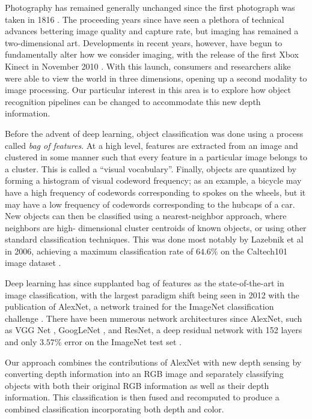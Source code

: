 
Photography has remained generally unchanged since the first photograph was
taken in 1816 \cite{Beaumont1982_photography}. The proceeding years since have
seen a plethora of technical advances bettering image quality and capture rate,
but imaging has remained a two-dimensional art. Developments in recent years,
however, have begun to fundamentally alter how we consider imaging, with the
release of the first Xbox Kinect in November 2010 \cite{Alex2009_kinect}. With
this launch, consumers and researchers alike were able to view the world in
three dimensions, opening up a second modality to image processing. Our
particular interest in this area is to explore how object recognition pipelines
can be changed to accommodate this new depth information.

Before the advent of deep learning, object classification was done using a
process called \textit{bag of features}. At a high level, features are extracted
from an image and clustered in some manner such that every feature in a
particular image belongs to a cluster. This is called a ``visual vocabulary''.
Finally, objects are quantized by forming a histogram of visual codeword
frequency; as an example, a bicycle may have a high frequency of codewords
corresponding to spokes on the wheels, but it may have a low frequency of
codewords corresponding to the hubcaps of a car. New objects can then be
classified using a nearest-neighbor approach, where neighbors are high-
dimensional cluster centroids of known objects, or using other standard
classification techniques. This was done most notably by Lazebnik et al in 2006,
achieving a maximum classification rate of $64.6\%$ on the Caltech101 image
dataset \cite{lazebnik_bof}.

Deep learning has since supplanted bag of features as the state-of-the-art in
image classification, with the largest paradigm shift being seen in 2012 with
the publication of AlexNet, a network trained for the ImageNet classification
challenge \cite{Krizhevsky2012_alexnet}. There have been numerous network
architectures since AlexNet, such as VGG Net \cite{Simonyan2014_vgg}, GoogLeNet
\cite{googlenet}, and ResNet, a deep residual network with 152 layers and only
$3.57\%$ error on the ImageNet test set \cite{resnet}.

Our approach combines the contributions of AlexNet with new depth sensing by converting depth information into an RGB image and separately classifying objects with both their original RGB information as well as their depth information. This classification is then fused and recomputed to produce a combined classification incorporating both depth and color. 
